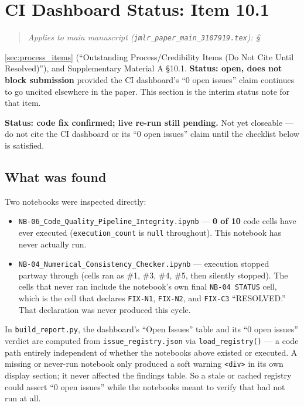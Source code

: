 \documentclass[11pt]{article}
\newenvironment{appliesto}[1]
  {\begin{quote}\small\itshape\noindent Applies to main manuscript
    (\texttt{jmlr\_paper\_main\_3107919.tex}): #1\end{quote}}
  {}
\begin{document}
\clearpage
\section{CI Dashboard Status: Item 10.1}
\label{supp:item10-1}

\begin{appliesto}
\S\ref{sec:process_items} (``Outstanding Process/Credibility Items (Do Not
Cite Until Resolved)''), and Supplementary Material A \S10.1.
\textbf{Status: open, does not block submission} provided the CI
dashboard's ``0 open issues'' claim continues to go uncited elsewhere in
the paper. This section is the interim status note for that item.
\end{appliesto}

\noindent\textbf{Status: code fix confirmed; live re-run still pending.}
Not yet closeable --- do not cite the CI dashboard or its ``0 open issues''
claim until the checklist below is satisfied.

\subsection*{What was found}
Two notebooks were inspected directly:
\begin{itemize}
  \item \texttt{NB-06\_Code\_Quality\_Pipeline\_Integrity.ipynb} --- \textbf{0 of 10}
    code cells have ever executed (\texttt{execution\_count} is \texttt{null}
    throughout). This notebook has never actually run.
  \item \texttt{NB-04\_Numerical\_Consistency\_Checker.ipynb} --- execution
    stopped partway through (cells ran as \#1, \#3, \#4, \#5, then silently
    stopped). The cells that never ran include the notebook's own final
    \texttt{NB-04 STATUS} cell, which is the cell that declares
    \texttt{FIX-N1}, \texttt{FIX-N2}, and \texttt{FIX-C3} ``RESOLVED.''
    That declaration was never produced this cycle.
\end{itemize}

\noindent In \texttt{build\_report.py}, the dashboard's ``Open Issues''
table and its ``0 open issues'' verdict are computed from
\texttt{issue\_registry.json} via \texttt{load\_registry()} ---
a code path entirely independent of whether the notebooks above
existed or executed. A missing or never-run notebook only produced a
soft warning \texttt{<div>} in its own display section; it never
affected the findings table. So a stale or cached registry could
assert ``0 open issues'' while the notebooks meant to verify that
had not run at all.
\end{document}
